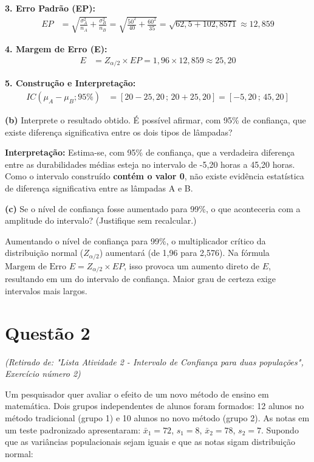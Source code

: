 \documentclass[12pt, a4paper]{article}
\begin{document}
\noindent \textbf{3. Erro Padrão (EP):}
\begin{align*}
EP &= \sqrt{\frac{\sigma_A^2}{n_A} + \frac{\sigma_B^2}{n_B}} = \sqrt{\frac{50^2}{40} + \frac{60^2}{35}} = \sqrt{62,5 + 102,8571} \approx \boxed{12,859}
\end{align*}

\noindent \textbf{4. Margem de Erro (E):}
\begin{align*}
E &= Z_{\alpha/2} \times EP = 1,96 \times 12,859 \approx \boxed{25,20}
\end{align*}

\noindent \textbf{5. Construção e Interpretação:}
\begin{align*}
IC(\mu_A - \mu_B; 95\%) &= [20 - 25,20 \,;\, 20 + 25,20] = \boxed{[-5,20 \,;\, 45,20]}
\end{align*}

\medskip\noindent\textbf{(b)} Interprete o resultado obtido. É possível afirmar, com 95\% de confiança, que existe diferença significativa entre os dois tipos de lâmpadas?

\noindent \textbf{Interpretação:} Estima-se, com 95\% de confiança, que a verdadeira diferença entre as durabilidades médias esteja no intervalo de -5,20 horas a 45,20 horas. Como o intervalo construído \textbf{contém o valor 0}, não existe evidência estatística de diferença significativa entre as lâmpadas A e B.

\medskip\noindent\textbf{(c)} Se o nível de confiança fosse aumentado para 99\%, o que aconteceria com a amplitude do intervalo? (Justifique sem recalcular.)

\noindent Aumentando o nível de confiança para 99\%, o multiplicador crítico da distribuição normal ($Z_{\alpha/2}$) aumentará (de 1,96 para 2,576). Na fórmula $\text{Margem de Erro } E = Z_{\alpha/2} \times EP$, isso provoca um aumento direto de $E$, resultando em um \textbf{} do intervalo de confiança. Maior grau de certeza exige intervalos mais largos.

\section*{Questão 2}
\textit{(Retirado de: "Lista Atividade 2 - Intervalo de Confiança para duas populações", Exercício número 2)}

Um pesquisador quer avaliar o efeito de um novo método de ensino em matemática. Dois grupos independentes de alunos foram formados: 12 alunos no método tradicional (grupo 1) e 10 alunos no novo método (grupo 2). As notas em um teste padronizado apresentaram:
$\bar{x}_1 = 72$, $s_1 = 8$, $\bar{x}_2 = 78$, $s_2 = 7$.
Supondo que as variâncias populacionais sejam iguais e que as notas sigam distribuição normal:
\end{document}
